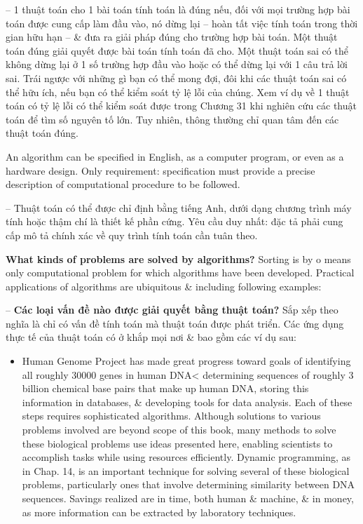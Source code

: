 \documentclass{article}
\begin{document}
\begin{itemize}
\begin{itemize}
\begin{itemize}
            -- 1 thuật toán cho 1 bài toán tính toán là đúng nếu, đối với mọi trường hợp bài toán được cung cấp làm đầu vào, nó dừng lại -- hoàn tất việc tính toán trong thời gian hữu hạn -- \& đưa ra giải pháp đúng cho trường hợp bài toán. Một thuật toán đúng giải quyết được bài toán tính toán đã cho. Một thuật toán sai có thể không dừng lại ở 1 số trường hợp đầu vào hoặc có thể dừng lại với 1 câu trả lời sai. Trái ngược với những gì bạn có thể mong đợi, đôi khi các thuật toán sai có thể hữu ích, nếu bạn có thể kiểm soát tỷ lệ lỗi của chúng. Xem ví dụ về 1 thuật toán có tỷ lệ lỗi có thể kiểm soát được trong Chương 31 khi nghiên cứu các thuật toán để tìm số nguyên tố lớn. Tuy nhiên, thông thường chỉ quan tâm đến các thuật toán đúng.
            
            An algorithm can be specified in English, as a computer program, or even as a hardware design. Only requirement: specification must provide a precise description of computational procedure to be followed.
            
            -- Thuật toán có thể được chỉ định bằng tiếng Anh, dưới dạng chương trình máy tính hoặc thậm chí là thiết kế phần cứng. Yêu cầu duy nhất: đặc tả phải cung cấp mô tả chính xác về quy trình tính toán cần tuân theo.
            
            {\bf What kinds of problems are solved by algorithms?} Sorting is by o means only computational problem for which algorithms have been developed. Practical applications of algorithms are ubiquitous \& including following examples:
            
            -- {\bf Các loại vấn đề nào được giải quyết bằng thuật toán?} Sắp xếp theo nghĩa là chỉ có vấn đề tính toán mà thuật toán được phát triển. Các ứng dụng thực tế của thuật toán có ở khắp mọi nơi \& bao gồm các ví dụ sau:
            \begin{itemize}
                \item Human Genome Project has made great progress toward goals of identifying all roughly 30000 genes in human DNA< determining sequences of roughly 3 billion chemical base pairs that make up human DNA, storing this information in databases, \& developing tools for data analysis. Each of these steps requires sophisticated algorithms. Although solutions to various problems involved are beyond scope of this book, many methods to solve these biological problems use ideas presented here, enabling scientists to accomplish tasks while using resources efficiently. Dynamic programming, as in Chap. 14, is an important technique for solving several of these biological problems, particularly ones that involve determining similarity between DNA sequences. Savings realized are in time, both human \& machine, \& in money, as more information can be extracted by laboratory techniques.
                

\end{itemize}
\end{itemize}
\end{itemize}
\end{itemize}
\end{document}
